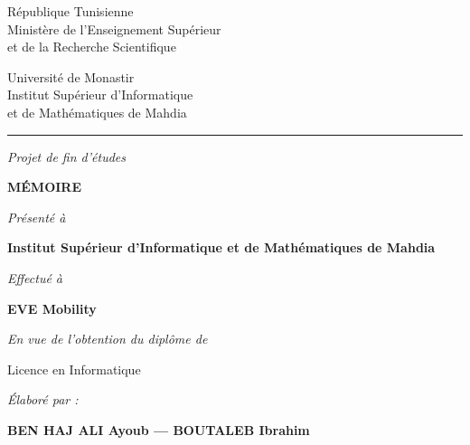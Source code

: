 \documentclass[12pt, a4paper]{report}
\begin{document}
\begin{titlepage}
  \thispagestyle{empty}

  \noindent
  \begin{minipage}[t]{0.48\textwidth}
    \small
    République Tunisienne\\
    Ministère de l'Enseignement Supérieur\\
    et de la Recherche Scientifique
  \end{minipage}
  \hfill
  \begin{minipage}[t]{0.48\textwidth}
    \raggedleft\small
    Université de Monastir\\
    Institut Supérieur d'Informatique\\
    et de Mathématiques de Mahdia
  \end{minipage}

  \vspace{0.4cm}
  {\color{isimablue}\rule{\linewidth}{2pt}}
  \vspace{0.2cm}

  \begin{center}
    \textit{\large Projet de fin d'études}

    \vspace{0.8cm}

    {\fontsize{48}{56}\selectfont\textbf{MÉMOIRE}}

    \vspace{0.5cm}
    \textit{Présenté à}

    \vspace{0.3cm}
    {\Large\textbf{Institut Supérieur d'Informatique et de Mathématiques de Mahdia}}

    \vspace{0.5cm}
    \textit{Effectué à}

    \vspace{0.3cm}
    {\Large\textbf{EVE Mobility}}

    \vspace{0.5cm}
    \textit{En vue de l'obtention du diplôme de}

    \vspace{0.3cm}
    Licence en Informatique

    \vspace{0.6cm}
    \textit{Élaboré par :}

    \vspace{0.3cm}
    {\large\textbf{BEN HAJ ALI Ayoub \quad --- \quad BOUTALEB Ibrahim}}


\end{center}
\end{titlepage}
\end{document}
